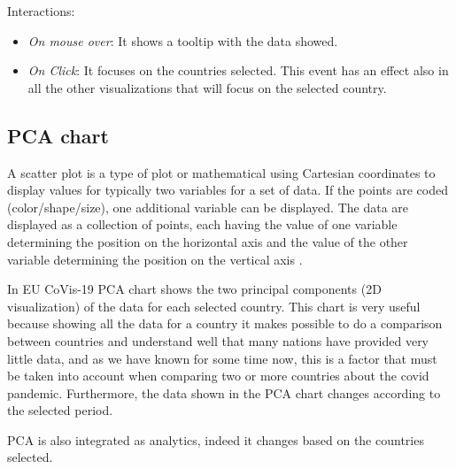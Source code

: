 \documentclass[10pt,conference]{IEEEtran}
\begin{document}
Interactions:
\begin{itemize}
 \item {\em On mouse over}: It shows a tooltip with the data showed.
 \item {\em On Click}: It focuses on the countries selected. This event has an effect also in all the other visualizations that will focus on the selected country.
\end{itemize}

\begin{figure}
\end{figure}

\subsection{PCA chart}
A scatter plot is a type of plot or mathematical
using Cartesian coordinates to display values for typically two variables for a set of data. If the points are coded (color/shape/size), 
one additional variable can be displayed. The data are displayed as a collection of points, each having the value of one variable 
determining the position on the horizontal axis and the value of the other variable determining the position on the vertical axis \cite{scatter}.

In EU CoVis-19 PCA chart shows the two principal components (2D visualization) of the data for each selected country. This chart is very useful because showing all the data for a country it makes possible to do a comparison between 
countries and understand well that many nations have provided very little data, and as we have known for some time now, this is a factor that must be taken into account when comparing two or more countries about the covid pandemic. 
Furthermore, the data shown in the PCA chart changes according to the selected period.

PCA is also integrated as analytics, indeed it changes based on the countries selected.
\end{document}
